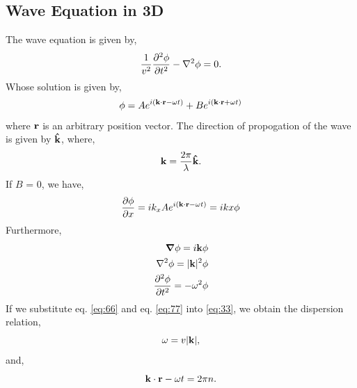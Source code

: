 \documentclass{book}
\begin{document}
\subsection{Wave Equation in 3D}
The wave equation is given by,
\begin{equation}
	\frac{1}{v^2} \pdv[2]{\phi}{t} - \laplacian{\phi} = 0. \label{eq:33}
\end{equation}
Whose solution is given by,
\begin{equation}
	\phi = Ae^{i(\vb{k}\cdot\vb{r} - \omega t)} + B e^{i(\vb{k}\cdot\vb{r} + \omega t)}
\end{equation}
where $\vb{r}$ is an arbitrary position vector. The direction of propogation of the wave is given by $\vu{k}$, where,
\begin{equation}
	\vb{k} = \frac{2\pi}{\lambda}\vu{k}.
\end{equation}
If $B$ = 0, we have,
\begin{equation}
	\pdv{\phi}{x} = ik_x Ae^{i(\vb{k}\cdot{\vb{r}} - \omega t)} = ikx \phi \label{eq:44}
\end{equation}
Furthermore,
\begin{align}
	\grad \phi = i\vb{k}\phi \label{eq:55}\\
	\laplacian \phi = |\vb{k}|^2 \phi \label{eq:66}\\
	\pdv[2]{\phi}{t} = - \omega^2 \phi \label{eq:77}
\end{align}
If we substitute eq. \eqref{eq:66} and eq. \eqref{eq:77} into \eqref{eq:33}, we obtain the dispersion relation,
\begin{equation}
	\omega = v|\vb{k}|,
\end{equation}
and,
\begin{equation}
	\vb{k}\cdot\vb{r} - \omega t = 2\pi n.
\end{equation}
\end{document}
